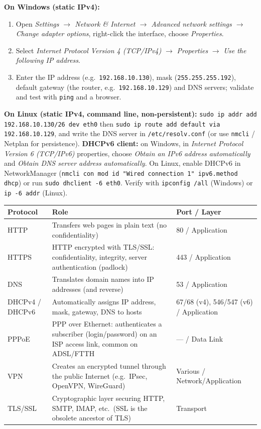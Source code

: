 \documentclass[11pt]{article}
\newcounter{popsec}
\newcounter{popsub}
\newcommand{\courssub}[1]{%
  \stepcounter{popsub}%
  \par\vspace{9pt}\noindent{\popxbold\fontsize{11.5}{13}\selectfont\color{popink}{\color{poporange}\thepopsec.\thepopsub}\hspace{6pt}#1}\par\nopagebreak\vspace{4pt}
}
\begin{document}
\begin{methode}
\textbf{On Windows (static IPv4):}
\begin{enumerate}
\item Open \emph{Settings $\rightarrow$ Network \& Internet $\rightarrow$ Advanced network settings $\rightarrow$ Change adapter options}, right-click the interface, choose \emph{Properties}.
\item Select \emph{Internet Protocol Version 4 (TCP/IPv4)} $\rightarrow$ \emph{Properties} $\rightarrow$ \emph{Use the following IP address}.
\item Enter the IP address (e.g.\ \texttt{192.168.10.130}), mask (\texttt{255.255.255.192}), default gateway (the router, e.g.\ \texttt{192.168.10.129}) and DNS servers; validate and test with \texttt{ping} and a browser.
\end{enumerate}
\textbf{On Linux (static IPv4, command line, non-persistent):} \texttt{sudo ip addr add 192.168.10.130/26 dev eth0} then \texttt{sudo ip route add default via 192.168.10.129}, and write the DNS server in \texttt{/etc/resolv.conf} (or use \texttt{nmcli} / Netplan for persistence).
\textbf{DHCPv6 client:} on Windows, in \emph{Internet Protocol Version 6 (TCP/IPv6)} properties, choose \emph{Obtain an IPv6 address automatically} and \emph{Obtain DNS server address automatically}. On Linux, enable DHCPv6 in NetworkManager (\texttt{nmcli con mod id "Wired connection 1" ipv6.method dhcp}) or run \texttt{sudo dhclient -6 eth0}. Verify with \texttt{ipconfig /all} (Windows) or \texttt{ip -6 addr} (Linux).
\end{methode}

\courssub{Key Protocols for Internet Access}

\begin{center}
\begin{tabularx}{\linewidth}{|l|X|l|}\hline
\rowcolor{popblueL}\textbf{Protocol} & \textbf{Role} & \textbf{Port / Layer}\\ \hline
HTTP & Transfers web pages in plain text (no confidentiality) & 80 / Application\\ \hline
HTTPS & HTTP encrypted with TLS/SSL: confidentiality, integrity, server authentication (padlock) & 443 / Application\\ \hline
DNS & Translates domain names into IP addresses (and reverse) & 53 / Application\\ \hline
DHCPv4 / DHCPv6 & Automatically assigns IP address, mask, gateway, DNS to hosts & 67/68 (v4), 546/547 (v6) / Application\\ \hline
PPPoE & PPP over Ethernet: authenticates a subscriber (login/password) on an ISP access link, common on ADSL/FTTH & --- / Data Link\\ \hline
VPN & Creates an encrypted tunnel through the public Internet (e.g.\ IPsec, OpenVPN, WireGuard) & Various / Network/Application\\ \hline
TLS/SSL & Cryptographic layer securing HTTP, SMTP, IMAP, etc.\ (SSL is the obsolete ancestor of TLS) & Transport\\ \hline
\end{tabularx}
\end{center}
\end{document}
